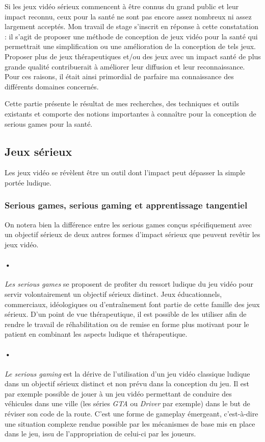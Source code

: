 Si les jeux vidéo sérieux commencent à être connus du grand public et leur impact reconnu, ceux pour la santé ne sont pas encore assez nombreux ni assez largement acceptés. Mon travail de stage s'inscrit en réponse à cette constatation : il s'agit de proposer une méthode de conception de jeux vidéo pour la santé qui permettrait une simplification ou une amélioration de la conception de tels jeux. Proposer plus de jeux  thérapeutiques et/ou des jeux avec un impact santé de plus grande qualité contribuerait à améliorer leur diffusion et leur reconnaissance. Pour ces raisons, il était ainsi primordial de parfaire ma connaissance des différents domaines concernés.

Cette partie présente le résultat de mes recherches, des techniques et outils existants et comporte des notions importantes à connaître pour la conception de serious games pour la santé.




	\subsection{Jeux sérieux}
Les jeux vidéo se révèlent être un outil dont l’impact peut dépasser la simple portée ludique. 
		\subsubsection*{Serious games, serious gaming et apprentissage tangentiel}
		\label{sggt}
On notera bien la différence entre les serious games conçus spécifiquement avec un objectif sérieux de deux autres formes d'impact sérieux que peuvent revêtir les jeux vidéo. 
\paragraph{•}\emph{Les serious games} se proposent de profiter du ressort ludique du jeu vidéo pour servir volontairement un objectif sérieux distinct. Jeux éducationnels, commerciaux, idéologiques ou d’entraînement font partie de cette famille des jeux sérieux. D’un point de vue thérapeutique, il est possible de les utiliser afin de rendre le travail de réhabilitation ou de remise en forme plus motivant pour le patient en combinant les aspects ludique et thérapeutique.

\paragraph{•}\emph{Le serious gaming} est la dérive de l'utilisation d'un jeu vidéo classique ludique dans un objectif sérieux distinct et non prévu dans la conception du jeu. Il est par exemple possible de jouer à un jeu vidéo permettant de conduire des véhicules dans une ville (les séries \emph{GTA} ou \emph{Driver} par exemple) dans le but de réviser son code de la route. C'est une forme de gameplay émergeant, c'est-à-dire une situation complexe rendue possible par les mécanismes de base mis en place dans le jeu, issu de l'appropriation de celui-ci par les joueurs.

